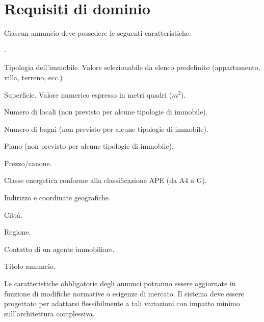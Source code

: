 \section{Requisiti di dominio}
Ciascun annuncio deve possedere le seguenti caratteristiche:
\begin{list}{$\cdot$}{}
    \item Tipologia dell'immobile. Valore selezionabile da elenco predefinito 
    (appartamento, villa, terreno, ecc.)
    \item Superficie. Valore numerico espresso in metri quadri ($m^2$).
    \item Numero di locali (non previsto per alcune tipologie di immobile).
    \item Numero di bagni (non previsto per alcune tipologie di immobile).
    \item Piano (non previsto per alcune tipologie di immobile).
    \item Prezzo/canone.
    \item Classe energetica conforme alla classificazione APE (da A4 a G).
    \item Indirizzo e coordinate geografiche.
    \item Cittá.
    \item Regione.
    \item Contatto di un agente immobiliare.
    \item Titolo annuncio.
\end{list}

Le caratteristiche obbligatorie degli annunci potranno essere aggiornate in 
funzione di modifiche normative o esigenze di mercato. Il sistema deve essere 
progettato per adattarsi flessibilmente a tali variazioni con impatto minimo 
sull'architettura complessiva.